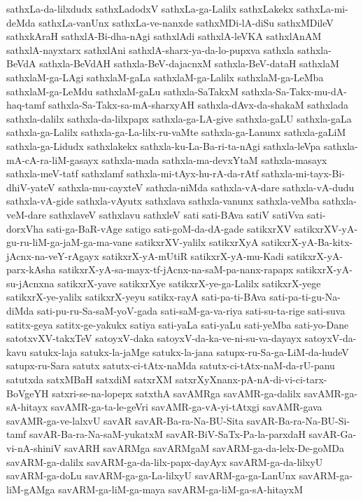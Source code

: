 {sathxLa-da-lilxdudx
sathxLadodxV
sathxLa-ga-Lalilx
sathxLakekx
sathxLa-mi-deMda
sathxLa-vanUnx
sathxLa-ve-nanxde
sathxMDi-lA-diSu
sathxMDileV
sathxkAraH
sathxlA-Bi-dha-nAgi
sathxlAdi
sathxlA-leVKA
sathxlAnAM
sathxlA-nayxtarx
sathxlAni
sathxlA-sharx-ya-da-lo-pupxva
sathxla
sathxla-BeVdA
sathxla-BeVdAH
sathxla-BeV-dajacnxM
sathxla-BeV-dataH
sathxlaM
sathxlaM-ga-LAgi
sathxlaM-gaLa
sathxlaM-ga-Lalilx
sathxlaM-ga-LeMba
sathxlaM-ga-LeMdu
sathxlaM-gaLu
sathxla-SaTakxM
sathxla-Sa-Takx-mu-dA-haq-tamf
sathxla-Sa-Takx-sa-mA-sharxyAH
sathxla-dAvx-da-shakaM
sathxlada
sathxla-dalilx
sathxla-da-lilxpapx
sathxla-ga-LA-give
sathxla-gaLU
sathxla-gaLa
sathxla-ga-Lalilx
sathxla-ga-La-lilx-ru-vaMte
sathxla-ga-Lanunx
sathxla-gaLiM
sathxla-ga-Lidudx
sathxlakekx
sathxla-ku-La-Ba-ri-ta-nAgi
sathxla-leVpa
sathxla-mA-cA-ra-liM-gasayx
sathxla-mada
sathxla-ma-devxYtaM
sathxla-masayx
sathxla-meV-tatf
sathxlamf
sathxla-mi-tAyx-hu-rA-da-rAtf
sathxla-mi-tayx-Bi-dhiV-yateV
sathxla-mu-cayxteV
sathxla-niMda
sathxla-vA-dare
sathxla-vA-dudu
sathxla-vA-gide
sathxla-vAyutx
sathxlava
sathxla-vanunx
sathxla-veMba
sathxla-veM-dare
sathxlaveV
sathxlavu
sathxleV
sati
sati-BAva
satiV
satiVva
sati-dorxVha
sati-ga-BaR-vAge
satigo
sati-goM-da-dA-gade
satikxrXV
satikxrXV-yA-gu-ru-liM-ga-jaM-ga-ma-vane
satikxrXV-yalilx
satikxrXyA
satikxrX-yA-Ba-kitx-jAcnx-na-veY-rAgayx
satikxrX-yA-mUtiR
satikxrX-yA-mu-Kadi
satikxrX-yA-parx-kAsha
satikxrX-yA-sa-mayx-tf-jAcnx-na-saM-pa-nanx-rapapx
satikxrX-yA-su-jAcnxna
satikxrX-yave
satikxrXye
satikxrX-ye-ga-Lalilx
satikxrX-yege
satikxrX-ye-yalilx
satikxrX-yeyu
satikx-rayA
sati-pa-ti-BAva
sati-pa-ti-gu-Na-diMda
sati-pu-ru-Sa-saM-yoV-gada
sati-saM-ga-va-riya
sati-su-ta-rige
sati-suva
satitx-geya
satitx-ge-yakukx
satiya
sati-yaLa
sati-yaLu
sati-yeMba
sati-yo-Dane
satotxvXV-takxTeV
satoyxV-daka
satoyxV-da-ka-ve-ni-su-va-dayayx
satoyxV-da-kavu
satukx-laja
satukx-la-jaMge
satukx-la-jana
satupx-ru-Sa-ga-LiM-da-hudeV
satupx-ru-Sara
satutx
satutx-ci-tAtx-naMda
satutx-ci-tAtx-naM-da-rU-panu
satutxda
satxMBaH
satxdiM
satxrXM
satxrXyXnanx-pA-nA-di-vi-ci-tarx-BoVgeYH
satxri-se-na-lopepx
satxthA
savAMRga
savAMR-ga-dalilx
savAMR-ga-sA-hitayx
savAMR-ga-ta-le-geVri
savAMR-ga-vA-yi-tAtxgi
savAMR-gava
savAMR-ga-ve-lalxvU
savAR
savAR-Ba-ra-Na-BU-Sita
savAR-Ba-ra-Na-BU-Si-tamf
savAR-Ba-ra-Na-saM-yukatxM
savAR-BiV-SaTx-Pa-la-parxdaH
savAR-Ga-vi-nA-shiniV
savARH
savARMga
savARMgaM
savARM-ga-da-lelx-De-goMDa
savARM-ga-dalilx
savARM-ga-da-lilx-papx-dayAyx
savARM-ga-da-lilxyU
savARM-ga-doLu
savARM-ga-ga-La-lilxyU
savARM-ga-ga-LanUnx
savARM-ga-liM-gAMga
savARM-ga-liM-ga-maya
savARM-ga-liM-ga-sA-hitayxM
}
